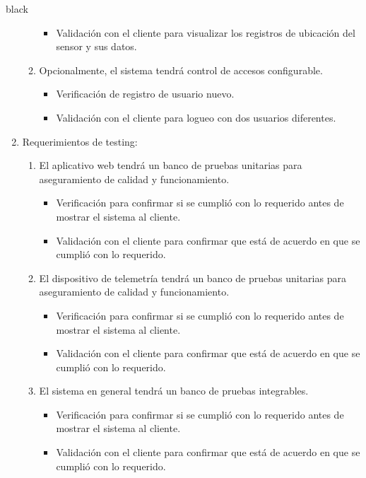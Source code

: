 \documentclass[
11pt, %
codirector, %
]{charter}
\begin{document}
\begin{consigna}{black}
\begin{enumerate}
\begin{enumerate}
\begin{itemize}
				\item Validación con el cliente para visualizar los registros de ubicación del sensor y sus datos. 
			\end{itemize}
		\item Opcionalmente, el sistema tendrá control de accesos configurable.
			\begin{itemize}
				\item Verificación de registro de usuario nuevo. 
				\item Validación con el cliente para logueo con dos usuarios diferentes.
			\end{itemize}
	\end{enumerate}

\item Requerimientos de testing:
	\begin{enumerate}
		\item El aplicativo web tendrá un banco de pruebas unitarias para aseguramiento de calidad y funcionamiento.
			\begin{itemize}
				\item Verificación para confirmar si se cumplió con lo requerido antes de mostrar el sistema al cliente.
				\item Validación con el cliente para confirmar que está de acuerdo en que se cumplió con lo requerido. 
			\end{itemize}
		\item El dispositivo de telemetría tendrá un banco de pruebas unitarias para aseguramiento de calidad y funcionamiento.
			\begin{itemize}
				\item Verificación para confirmar si se cumplió con lo requerido antes de mostrar el sistema al cliente. 
				\item Validación con el cliente para confirmar que está de acuerdo en que se cumplió con lo requerido.  
			\end{itemize}
		\item El sistema en general tendrá un banco de pruebas integrables.
			\begin{itemize}
				\item Verificación para confirmar si se cumplió con lo requerido antes de mostrar el sistema al cliente. 
				\item Validación con el cliente para confirmar que está de acuerdo en que se cumplió con lo requerido. 
			\end{itemize}
	\end{enumerate}


\end{enumerate}
\end{consigna}
\end{document}
